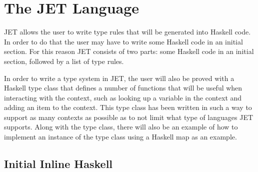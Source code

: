 \section{The JET Language}

JET allows the user to write type rules that will be generated into Haskell code.
In order to do that the user may have to write some Haskell code in an initial section.
For this reason JET consists of two parts: some Haskell code in an initial section, followed by a list of type rules.

In order to write a type system in JET, the user will also be proved with a Haskell type class that defines a number of functions that will be useful when interacting with the context, such as looking up a variable in the context and adding an item to the context.
This type class has been written in such a way to support as many contexts as possible as to not limit what type of languages JET supports.
Along with the type class, there will also be an example of how to implement an instance of the type class using a Haskell map as an example.

\subsection{Initial Inline Haskell}